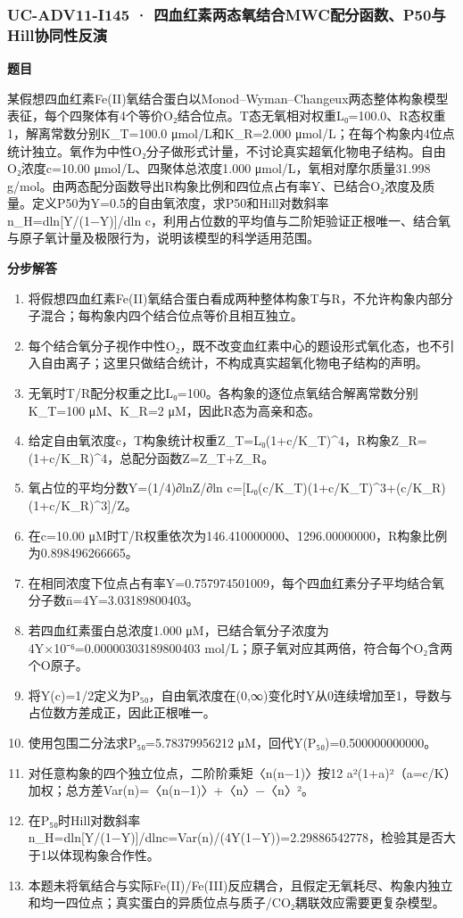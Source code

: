 \documentclass[UTF8,11pt,a4paper]{ctexart}
\begin{document}
\subsubsection*{UC-ADV11-I145 · 四血红素两态氧结合MWC配分函数、P50与Hill协同性反演}
\noindent\textbf{题目}\par
某假想四血红素Fe(II)氧结合蛋白以Monod–Wyman–Changeux两态整体构象模型表征，每个四聚体有4个等价O₂结合位点。T态无氧相对权重L₀=100.0、R态权重1，解离常数分别K\_T=100.0 μmol/L和K\_R=2.000 μmol/L；在每个构象内4位点统计独立。氧作为中性O₂分子做形式计量，不讨论真实超氧化物电子结构。自由O₂浓度c=10.00 μmol/L、四聚体总浓度1.000 μmol/L，氧相对摩尔质量31.998 g/mol。由两态配分函数导出R构象比例和四位点占有率Y、已结合O₂浓度及质量。定义P50为Y=0.5的自由氧浓度，求P50和Hill对数斜率n\_H=dln[Y/(1−Y)]/dln c，利用占位数的平均值与二阶矩验证正根唯一、结合氧与原子氧计量及极限行为，说明该模型的科学适用范围。\par
\medskip\noindent\textbf{分步解答}
\begin{enumerate}
\item 将假想四血红素Fe(II)氧结合蛋白看成两种整体构象T与R，不允许构象内部分子混合；每构象内四个结合位点等价且相互独立。
\item 每个结合氧分子视作中性O₂，既不改变血红素中心的题设形式氧化态，也不引入自由离子；这里只做结合统计，不构成真实超氧化物电子结构的声明。
\item 无氧时T/R配分权重之比L₀=100。各构象的逐位点氧结合解离常数分别K\_T=100 μM、K\_R=2 μM，因此R态为高亲和态。
\item 给定自由氧浓度c，T构象统计权重Z\_T=L₀(1+c/K\_T)\textasciicircum{}4，R构象Z\_R=(1+c/K\_R)\textasciicircum{}4，总配分函数Z=Z\_T+Z\_R。
\item 氧占位的平均分数Y=(1/4)∂lnZ/∂ln c=[L₀(c/K\_T)(1+c/K\_T)\textasciicircum{}3+(c/K\_R)(1+c/K\_R)\textasciicircum{}3]/Z。
\item 在c=10.00 μM时T/R权重依次为146.410000000、1296.00000000，R构象比例为0.898496266665。
\item 在相同浓度下位点占有率Y=0.757974501009，每个四血红素分子平均结合氧分子数n̄=4Y=3.03189800403。
\item 若四血红素蛋白总浓度1.000 μM，已结合氧分子浓度为4Y×10⁻⁶=0.00000303189800403 mol/L；原子氧对应其两倍，符合每个O₂含两个O原子。
\item 将Y(c)=1/2定义为P₅₀，自由氧浓度在(0,∞)变化时Y从0连续增加至1，导数与占位数方差成正，因此正根唯一。
\item 使用包围二分法求P₅₀=5.78379956212 μM，回代Y(P₅₀)=0.500000000000。
\item 对任意构象的四个独立位点，二阶阶乘矩〈n(n−1)〉按12 a²(1+a)²（a=c/K）加权；总方差Var(n)=〈n(n−1)〉+〈n〉−〈n〉²。
\item 在P₅₀时Hill对数斜率n\_H=dln[Y/(1−Y)]/dlnc=Var(n)/(4Y(1−Y))=2.29886542778，检验其是否大于1以体现构象合作性。
\item 本题未将氧结合与实际Fe(II)/Fe(III)反应耦合，且假定无氧耗尽、构象内独立和均一四位点；真实蛋白的异质位点与质子/CO₂耦联效应需要更复杂模型。
\end{enumerate}
\end{document}
